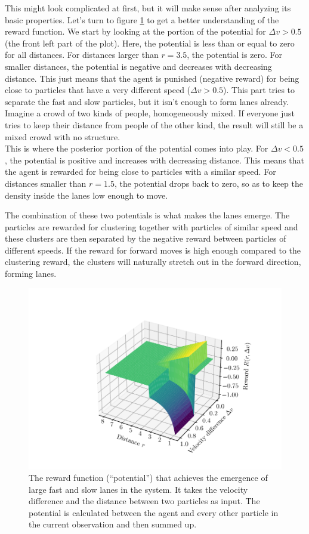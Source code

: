 This might look complicated at first, but it will make sense after analyzing its basic properties. Let's turn to figure \ref{fig:lane_reward_func_3d} to get a better understanding of the reward function. We start by looking at the portion of the potential for $\Delta v > 0.5$ (the front left part of the plot). Here, the potential is less than or equal to zero for all distances. For distances larger than $r=3.5$, the potential is zero. For smaller distances, the potential is negative and decreases with decreasing distance. This just means that the agent is punished (negative reward) for being close to particles that have a very different speed ($\Delta v > 0.5$). This part tries to separate the fast and slow particles, but it isn't enough to form lanes already. Imagine a crowd of two kinds of people, homogeneously mixed. If everyone just tries to keep their distance from people of the other kind, the result will still be a mixed crowd with no structure.
\\
This is where the posterior portion of the potential comes into play. For $\Delta v < 0.5$, the potential is positive and increases with decreasing distance. This means that the agent is rewarded for being close to particles with a similar speed. For distances smaller than $r=1.5$, the potential drops back to zero, so as to keep the density inside the lanes low enough to move.


The combination of these two potentials is what makes the lanes emerge. The particles are rewarded for clustering together with particles of similar speed and these clusters are then separated by the negative reward between particles of different speeds. If the reward for forward moves is high enough compared to the clustering reward, the clusters will naturally stretch out in the forward direction, forming lanes.

\begin{figure}[H]
    \centering
    \includegraphics{lane_reward_func_3d_cropped.pdf}
    \caption{The reward function (\enquote{potential}) that achieves the emergence of large fast and slow lanes in the system. It takes the velocity difference and the distance between two particles as input. The potential is calculated between the agent and every other particle in the current observation and then summed up.}
    \label{fig:lane_reward_func_3d}
\end{figure}

